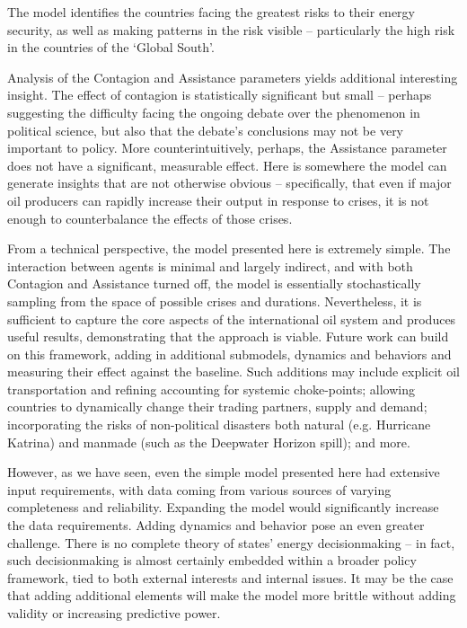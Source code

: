 \documentclass{llncs}
\begin{document}
The model identifies the countries facing the greatest risks to their energy security, as well as making patterns in the risk visible -- particularly the high risk in the countries of the `Global South'. 

Analysis of the Contagion and Assistance parameters yields additional interesting insight. The effect of contagion is statistically significant but small -- perhaps suggesting the difficulty facing the ongoing debate over the phenomenon in political science, but also that the debate's conclusions may not be very important to policy. More counterintuitively, perhaps, the Assistance parameter does not have a significant, measurable effect. Here is somewhere the model can generate insights that are not otherwise obvious -- specifically, that even if major oil producers can rapidly increase their output in response to crises, it is not enough to counterbalance the effects of those crises. 

From a technical perspective, the model presented here is extremely simple. The interaction between agents is minimal and largely indirect, and with both Contagion and Assistance turned off, the model is essentially stochastically sampling from the space of possible crises and durations. Nevertheless, it is sufficient to capture the core aspects of the international oil system and produces useful results, demonstrating that the approach is viable. Future work can build on this framework, adding in additional submodels, dynamics and behaviors and measuring their effect against the baseline. Such additions may include explicit oil transportation and refining accounting for systemic choke-points; allowing countries to dynamically change their trading partners, supply and demand; incorporating the risks of non-political disasters both natural (e.g. Hurricane Katrina) and manmade (such as the Deepwater Horizon spill); and more.

However, as we have seen, even the simple model presented here had extensive input requirements, with data coming from various sources of varying completeness and reliability. Expanding the model would significantly increase the data requirements. Adding dynamics and behavior pose an even greater challenge. There is no complete theory of states' energy decisionmaking -- in fact, such decisionmaking is almost certainly embedded within a broader policy framework, tied to both external interests and internal issues. It may be the case that adding additional elements will make the model more brittle without adding validity or increasing predictive power.
\end{document}
